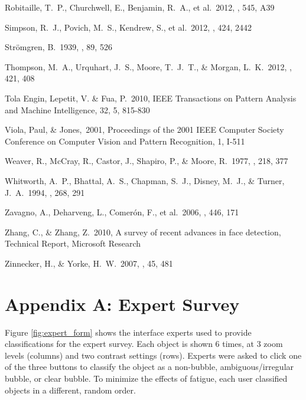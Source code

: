 \begin{thebibliography}{16}
 Robitaille, T.~P., Churchwell, E., Benjamin, R.~A., et al.\ 2012, \aap, 545, A39

 Simpson, R.~J., Povich,
M.~S., Kendrew, S., et al.\ 2012, \mnras, 424, 2442

 Str{\"o}mgren, B.\ 1939,
\apj, 89, 526

 Thompson, M.~A.,
Urquhart, J.~S., Moore, T.~J.~T., \& Morgan, L.~K.\ 2012, \mnras, 421, 408

Tola Engin, Lepetit, V. \& Fua, P.\ 2010, IEEE Transactions on Pattern Analysis and Machine Intelligence, 32, 5, 815-830

Viola, Paul, \& Jones,\ 2001, Proceedings of the 2001 IEEE Computer Society Conference on Computer Vision and Pattern Recognition, 1, I-511

 Weaver, R., McCray, R.,
Castor, J., Shapiro, P., \& Moore, R.\ 1977, \apj, 218, 377

 Whitworth, A.~P.,
Bhattal, A.~S., Chapman, S.~J., Disney, M.~J.,
\& Turner, J.~A.\ 1994, \mnras, 268, 291

 Zavagno, A., Deharveng, L., Comer{\'o}n, F., et al.\ 2006, \aap, 446, 171

Zhang, C., \& Zhang, Z.\ 2010, A survey of recent advances in face detection, Technical Report, Microsoft Research

 Zinnecker, H., \& Yorke, H.~W.\ 2007, \araa, 45, 481

\end{thebibliography}

\section{Appendix A: Expert Survey}
Figure \ref{fig:expert_form} shows the interface experts used to provide classifications for the expert survey. Each object is shown 6 times, at 3 zoom levels (columns) and two contrast settings (rows). Experts were asked to click one of the three buttons to classify the object as a non-bubble, ambiguous/irregular bubble, or clear bubble. To minimize the effects of fatigue, each user classified objects in a different, random order.

